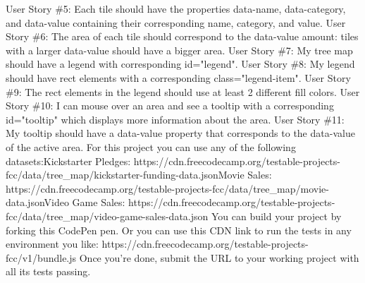 \documentclass{article}%
\begin{document}
User Story \#5: Each tile should have the properties data{-}name, data{-}category, and data{-}value containing their corresponding name, category, and value.\newline%
User Story \#6: The area of each tile should correspond to the data{-}value amount: tiles with a larger data{-}value should have a bigger area.\newline%
User Story \#7: My tree map should have a legend with corresponding id="legend".\newline%
User Story \#8: My legend should have rect elements with a corresponding class="legend{-}item".\newline%
User Story \#9: The rect elements in the legend should use at least 2 different fill colors.\newline%
User Story \#10: I can mouse over an area and see a tooltip with a corresponding id="tooltip" which displays more information about the area.\newline%
User Story \#11: My tooltip should have a data{-}value property that corresponds to the data{-}value of the active area.\newline%
For this project you can use any of the following datasets:Kickstarter Pledges: https://cdn.freecodecamp.org/testable{-}projects{-}fcc/data/tree\_map/kickstarter{-}funding{-}data.jsonMovie Sales: https://cdn.freecodecamp.org/testable{-}projects{-}fcc/data/tree\_map/movie{-}data.jsonVideo Game Sales: https://cdn.freecodecamp.org/testable{-}projects{-}fcc/data/tree\_map/video{-}game{-}sales{-}data.json\newline%
You can build your project by forking this CodePen pen. Or you can use this CDN link to run the tests in any environment you like: https://cdn.freecodecamp.org/testable{-}projects{-}fcc/v1/bundle.js\newline%
Once you're done, submit the URL to your working project with all its tests passing.\newline%

%
\newpage%
\end{document}

